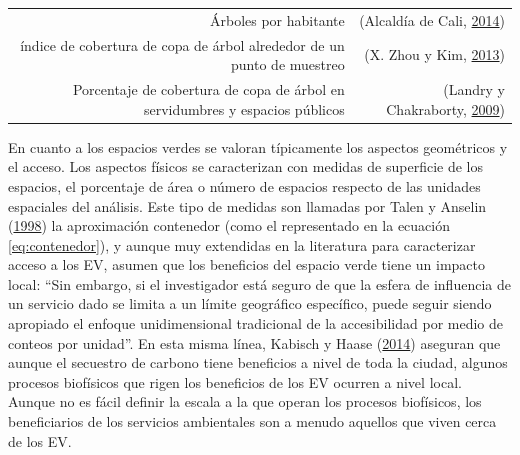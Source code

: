 \documentclass[12pt,a4paper,openany]{book}
\theoremstyle{definition}
\theoremstyle{definition}
\theoremstyle{definition}
\theoremstyle{remark}
\begin{document}
\begin{longtable}[]{@{}rr@{}}
\begin{minipage}[t]{0.57\columnwidth}\raggedleft\strut
Árboles por habitante\strut
\end{minipage} & \begin{minipage}[t]{0.31\columnwidth}\raggedleft\strut
(Alcaldía de Cali, \protect\hyperlink{ref-pot2014cali}{2014})\strut
\end{minipage}\tabularnewline
\begin{minipage}[t]{0.57\columnwidth}\raggedleft\strut
índice de cobertura de copa de árbol alrededor de un punto de
muestreo\strut
\end{minipage} & \begin{minipage}[t]{0.31\columnwidth}\raggedleft\strut
(X. Zhou y Kim, \protect\hyperlink{ref-zhou_social_2013}{2013})\strut
\end{minipage}\tabularnewline
\begin{minipage}[t]{0.57\columnwidth}\raggedleft\strut
Porcentaje de cobertura de copa de árbol en servidumbres y espacios
públicos\strut
\end{minipage} & \begin{minipage}[t]{0.31\columnwidth}\raggedleft\strut
(Landry y Chakraborty,
\protect\hyperlink{ref-landry_street_2009}{2009})\strut
\end{minipage}\tabularnewline
\bottomrule
\end{longtable}

En cuanto a los espacios verdes se valoran típicamente los aspectos
geométricos y el acceso. Los aspectos físicos se caracterizan con
medidas de superficie de los espacios, el porcentaje de área o número de
espacios respecto de las unidades espaciales del análisis. Este tipo de
medidas son llamadas por Talen y Anselin
(\protect\hyperlink{ref-talen_assessing_1998}{1998}) la aproximación
contenedor (como el representado en la ecuación \eqref{eq:contenedor}), y
aunque muy extendidas en la literatura para caracterizar acceso a los
EV, asumen que los beneficios del espacio verde tiene un impacto local:
``Sin embargo, si el investigador está seguro de que la esfera de
influencia de un servicio dado se limita a un límite geográfico
específico, puede seguir siendo apropiado el enfoque unidimensional
tradicional de la accesibilidad por medio de conteos por unidad''. En
esta misma línea, Kabisch y Haase
(\protect\hyperlink{ref-kabisch_green_2014}{2014}) aseguran que aunque
el secuestro de carbono tiene beneficios a nivel de toda la ciudad,
algunos procesos biofísicos que rigen los beneficios de los EV ocurren a
nivel local. Aunque no es fácil definir la escala a la que operan los
procesos biofísicos, los beneficiarios de los servicios ambientales son
a menudo aquellos que viven cerca de los EV.
\end{document}
